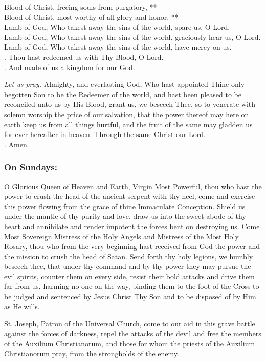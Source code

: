 \documentclass{article}
\makeatletter
\DeclareRobustCommand{\versicle}{\textbf{\vers@resp{-0.1em}{V}}}
\DeclareRobustCommand{\response}{\textbf{\vers@resp{0pt}{R}}}
\newcommand{\vers@resp@sym}{\raisebox{0.2ex}{\rotatebox[origin=c]{-20}{$\m@th\rceil$}}}
\newcommand{\vers@resp}[2]{%
  {\ooalign{\hidewidth\kern#1\vers@resp@sym\hidewidth\cr#2\cr}}%
}
\makeatother
\begin{document}
\begin{multicols}{3}
\begin{FlushLeft}
Blood of Christ, freeing souls from purgatory, **\\
Blood of Christ, most worthy of all glory and honor, **\\
Lamb of God, Who takest away the sins of the world, spare us, O Lord.\\
Lamb of God, Who takest away the sins of the world, graciously hear us, O Lord.\\
Lamb of God, Who takest away the sins of the world, have mercy on us.\\
\versicle. Thou hast redeemed us with Thy Blood, O Lord.\\
\response. And made of us a kingdom for our God.
\end{FlushLeft}

\textit{Let us pray.}  Almighty, and everlasting God, Who hast appointed Thine only-begotten Son to be
the Redeemer of the world, and hast been pleased to be reconciled unto us by His
Blood, grant us, we beseech Thee, so to venerate with solemn worship the price of
our salvation, that the power thereof may here on earth keep us from all things
hurtful, and the fruit of the same may gladden us for ever hereafter in heaven.
Through the same Christ our Lord.\\
\response. Amen.

\subsubsection*{On Sundays:}
O Glorious Queen of Heaven and Earth, Virgin Most Powerful, thou who hast the
power to crush the head of the ancient serpent with thy heel, come and exercise this
power flowing from the grace of thine Immaculate Conception. Shield us under the
mantle of thy purity and love, draw us into the sweet abode of thy heart and
annihilate and render impotent the forces bent on destroying us. Come Most
Sovereign Mistress of the Holy Angels and Mistress of the Most Holy Rosary, thou
who from the very beginning hast received from God the power and the mission to
crush the head of Satan. Send forth thy holy legions, we humbly beseech thee, that
under thy command and by thy power they may pursue the evil spirits, counter them
on every side, resist their bold attacks and drive them far from us, harming no one
on the way, binding them to the foot of the Cross to be judged and sentenced by
Jesus Christ Thy Son and to be disposed of by Him as He wills.

St. Joseph, Patron of the Universal Church, come to our aid in this grave
battle against the forces of darkness, repel the attacks of the devil and free the
members of the Auxilium Christianorum, and those for whom the priests of the
Auxilium Christianorum pray, from the strongholds of the enemy.


\end{multicols}
\end{document}
